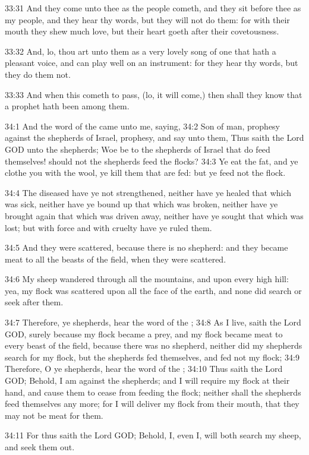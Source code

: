 33:31 And they come unto thee as the people cometh, and they sit
before thee as my people, and they hear thy words, but they will not
do them: for with their mouth they shew much love, but their heart
goeth after their covetousness.

33:32 And, lo, thou art unto them as a very lovely song of one that
hath a pleasant voice, and can play well on an instrument: for they
hear thy words, but they do them not.

33:33 And when this cometh to pass, (lo, it will come,) then shall
they know that a prophet hath been among them.

34:1 And the word of the \LORD came unto me, saying, 34:2 Son of man,
prophesy against the shepherds of Israel, prophesy, and say unto them,
Thus saith the Lord GOD unto the shepherds; Woe be to the shepherds of
Israel that do feed themselves! should not the shepherds feed the
flocks?  34:3 Ye eat the fat, and ye clothe you with the wool, ye kill
them that are fed: but ye feed not the flock.

34:4 The diseased have ye not strengthened, neither have ye healed
that which was sick, neither have ye bound up that which was broken,
neither have ye brought again that which was driven away, neither have
ye sought that which was lost; but with force and with cruelty have ye
ruled them.

34:5 And they were scattered, because there is no shepherd: and they
became meat to all the beasts of the field, when they were scattered.

34:6 My sheep wandered through all the mountains, and upon every high
hill: yea, my flock was scattered upon all the face of the earth, and
none did search or seek after them.

34:7 Therefore, ye shepherds, hear the word of the \LORD; 34:8 As I
live, saith the Lord GOD, surely because my flock became a prey, and
my flock became meat to every beast of the field, because there was no
shepherd, neither did my shepherds search for my flock, but the
shepherds fed themselves, and fed not my flock; 34:9 Therefore, O ye
shepherds, hear the word of the \LORD; 34:10 Thus saith the Lord GOD;
Behold, I am against the shepherds; and I will require my flock at
their hand, and cause them to cease from feeding the flock; neither
shall the shepherds feed themselves any more; for I will deliver my
flock from their mouth, that they may not be meat for them.

34:11 For thus saith the Lord GOD; Behold, I, even I, will both search
my sheep, and seek them out.


